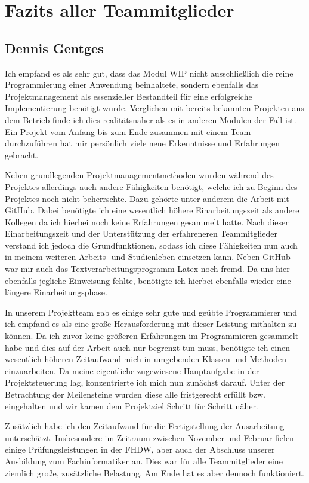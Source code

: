 \section{Fazits aller Teammitglieder}

\subsection{Dennis Gentges}
Ich empfand es als sehr gut, dass das Modul WIP nicht ausschließlich die reine Programmierung einer Anwendung beinhaltete, sondern ebenfalls das Projektmanagement als essenzieller Bestandteil für eine erfolgreiche Implementierung benötigt wurde. Verglichen mit bereits bekannten Projekten aus dem Betrieb finde ich dies realitätsnaher als es in anderen Modulen der Fall ist. Ein Projekt vom Anfang bis zum Ende zusammen mit einem Team durchzuführen hat mir persönlich viele neue Erkenntnisse und Erfahrungen gebracht.

Neben grundlegenden Projektmanagementmethoden wurden während des Projektes allerdings auch andere Fähigkeiten benötigt, welche ich zu Beginn des Projektes noch nicht beherrschte. Dazu gehörte unter anderem die Arbeit mit GitHub. Dabei benötigte ich eine wesentlich höhere Einarbeitungszeit als andere Kollegen da ich hierbei noch keine Erfahrungen gesammelt hatte. Nach dieser Einarbeitungszeit und der Unterstützung der erfahreneren Teammitglieder verstand ich jedoch die Grundfunktionen, sodass ich diese Fähigkeiten nun auch in meinem weiteren Arbeits- und Studienleben einsetzen kann. 
Neben GitHub war mir auch das Textverarbeitungsprogramm Latex noch fremd. Da uns hier ebenfalls jegliche Einweisung fehlte, benötigte ich hierbei ebenfalls wieder eine längere Einarbeitungsphase.

In unserem Projektteam gab es einige sehr gute und geübte Programmierer und ich empfand es als eine große Herausforderung mit dieser Leistung mithalten zu können. Da ich zuvor keine größeren Erfahrungen im Programmieren gesammelt habe und dies auf der Arbeit auch nur begrenzt tun muss, benötigte ich einen wesentlich höheren Zeitaufwand mich in umgebenden Klassen und Methoden einzuarbeiten. Da meine eigentliche zugewiesene Hauptaufgabe in der Projektsteuerung lag, konzentrierte ich mich nun zunächst darauf. Unter der Betrachtung der Meilensteine wurden diese alle fristgerecht erfüllt bzw. eingehalten und wir kamen dem Projektziel Schritt für Schritt näher.

Zusätzlich habe ich den Zeitaufwand für die Fertigstellung der Ausarbeitung unterschätzt. Insbesondere im Zeitraum zwischen November und Februar fielen einige Prüfungsleistungen in der FHDW, aber auch der Abschluss unserer Ausbildung zum Fachinformatiker an. Dies war für alle Teammitglieder eine ziemlich große, zusätzliche Belastung. Am Ende hat es aber dennoch funktioniert.

